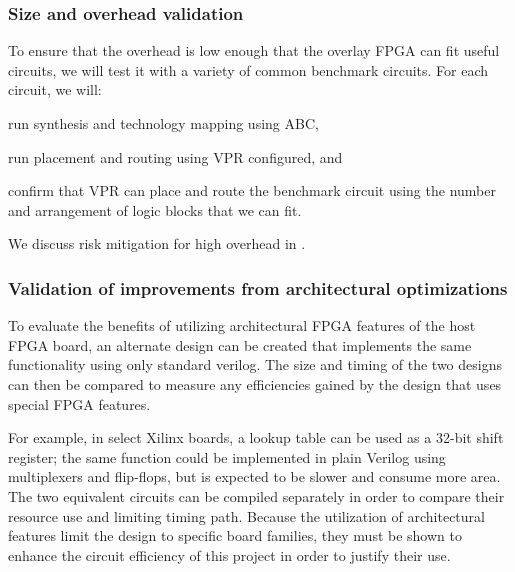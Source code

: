 \subsubsection{Size and overhead validation}

To ensure that the overhead is low enough that the overlay FPGA can fit useful circuits, we will test it with a variety of common benchmark circuits.
For each circuit, we will:
\begin{enumeration}
	\item run synthesis and technology mapping using ABC,
	\item run placement and routing using VPR configured, and
	\item confirm that VPR can place and route the benchmark circuit using the number and arrangement of logic blocks that we can fit.
\end{enumeration}
We discuss risk mitigation for high overhead in .


\subsubsection{Validation of improvements from architectural optimizations}

To evaluate the benefits of utilizing architectural FPGA features of the host FPGA board, an alternate design can be created that implements the same functionality using only standard verilog.
The size and timing of the two designs can then be compared to measure any efficiencies gained by the design that uses special FPGA features.

For example, in select Xilinx boards, a lookup table can be used as a 32-bit shift register; the same function could be implemented in plain Verilog using multiplexers and flip-flops, but is expected to be slower and consume more area.
The two equivalent circuits can be compiled separately in order to compare their resource use and limiting timing path.
Because the utilization of architectural features limit the design to specific board families, they must be shown to enhance the circuit efficiency of this project in order to justify their use.

